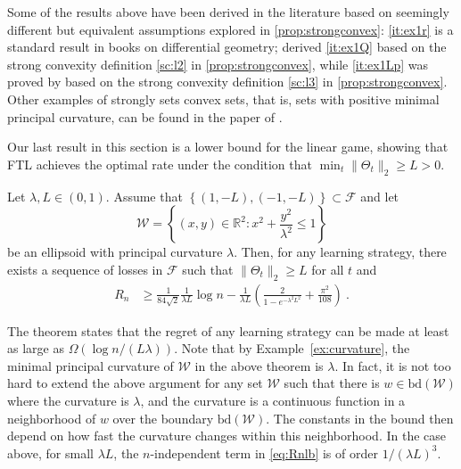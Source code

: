 \documentclass[english]{article}
\newcommand{\cW}{\mathcal{W}}
\newcommand{\cF}{\mathcal{F}}
\newcommand{\seto}[1]{\left\{#1\right\}}
\newcommand{\R}{\mathbb{R}}
\newcommand{\bd}{\mathrm{bd}}
\begin{document}
Some of the results above have been derived in the literature based on seemingly different but equivalent assumptions explored in \cref{prop:strongconvex}:
 \eqref{it:ex1r} is a standard result in books on differential geometry; \citet{Pol96} derived \eqref{it:ex1Q} based on the strong convexity definition \eqref{sc:l2} in  \cref{prop:strongconvex}, while \eqref{it:ex1Lp} was proved by \citet{garber2014faster} based on the strong convexity definition \eqref{sc:l3} in  \cref{prop:strongconvex}. Other examples of strongly sets convex sets, that is, sets with positive minimal principal curvature, can be found in the paper of \citet{garber2014faster}.
 
Our last result in this section is a lower bound for the linear game, showing that FTL achieves the optimal rate under the condition that  $\min_t \|\Theta_t\|_2\ge L >0$.
\begin{theorem}
	\label{thm:lowerbound}
		Let $\lambda,L \in (0,1)$. Assume that  $\seto{(1,-L), (-1, -L)} \subset \cF$ and let \[
		\cW = \seto{(x,y) \in \R^2: x^2 + \frac{y^2}{\lambda^2} \le 1}
		\]
		be
		an ellipsoid with principal curvature $\lambda$.
 		Then, for any learning strategy, there exists a sequence of losses in $\mathcal F$ such that $\|\Theta_t\|_2 \ge L$ for all $t$ and
		\begin{align}\label{eq:Rnlb}
		R_n &\ge \frac{1}{84\sqrt{2}}\frac{1}{\lambda L} \log n  - \frac{1}{\lambda L} \left(\frac{2}{1-e^{-\lambda^2L^2}} + \frac{\pi^2}{108}\right)~.
		\end{align}
\end{theorem}
The theorem states that the regret of any learning strategy can be made at least  as large as $\Omega\left(\log n/(L\lambda)\right)$.
Note that by Example~\ref{ex:curvature}, the minimal principal curvature of $\cW$ in the above theorem is $\lambda$. In fact, it is not too hard to extend the above argument for any set $\cW$ such that there is $w \in \bd(\cW)$ where the curvature is $\lambda$, and the curvature is a continuous function in a neighborhood of $w$ over the boundary $\bd(\cW)$. The constants in the bound then depend on how fast the curvature changes within this neighborhood. In the case above, for small $\lambda L$, the $n$-independent term in \eqref{eq:Rnlb} is of order $1/(\lambda L)^3$.
\end{document}
